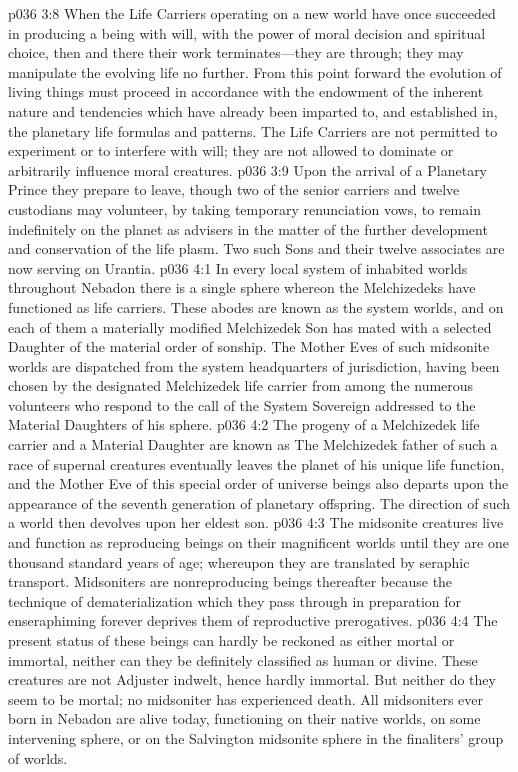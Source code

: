 \vs p036 3:8 When the Life Carriers operating on a new world have once succeeded in producing a being with will, with the power of moral decision and spiritual choice, then and there their work terminates---they are through; they may manipulate the evolving life no further. From this point forward the evolution of living things must proceed in accordance with the endowment of the inherent nature and tendencies which have already been imparted to, and established in, the planetary life formulas and patterns. The Life Carriers are not permitted to experiment or to interfere with will; they are not allowed to dominate or arbitrarily influence moral creatures.
\vs p036 3:9 Upon the arrival of a Planetary Prince they prepare to leave, though two of the senior carriers and twelve custodians may volunteer, by taking temporary renunciation vows, to remain indefinitely on the planet as advisers in the matter of the further development and conservation of the life plasm. Two such Sons and their twelve associates are now serving on Urantia.
\vs p036 4:1 In every local system of inhabited worlds throughout Nebadon there is a single sphere whereon the Melchizedeks have functioned as life carriers. These abodes are known as the system  worlds, and on each of them a materially modified Melchizedek Son has mated with a selected Daughter of the material order of sonship. The Mother Eves of such midsonite worlds are dispatched from the system headquarters of jurisdiction, having been chosen by the designated Melchizedek life carrier from among the numerous volunteers who respond to the call of the System Sovereign addressed to the Material Daughters of his sphere.
\vs p036 4:2 The progeny of a Melchizedek life carrier and a Material Daughter are known as  The Melchizedek father of such a race of supernal creatures eventually leaves the planet of his unique life function, and the Mother Eve of this special order of universe beings also departs upon the appearance of the seventh generation of planetary offspring. The direction of such a world then devolves upon her eldest son.
\vs p036 4:3 The midsonite creatures live and function as reproducing beings on their magnificent worlds until they are one thousand standard years of age; whereupon they are translated by seraphic transport. Midsoniters are nonreproducing beings thereafter because the technique of dematerialization which they pass through in preparation for enseraphiming forever deprives them of reproductive prerogatives.
\vs p036 4:4 The present status of these beings can hardly be reckoned as either mortal or immortal, neither can they be definitely classified as human or divine. These creatures are not Adjuster indwelt, hence hardly immortal. But neither do they seem to be mortal; no midsoniter has experienced death. All midsoniters ever born in Nebadon are alive today, functioning on their native worlds, on some intervening sphere, or on the Salvington midsonite sphere in the finaliters’ group of worlds.
